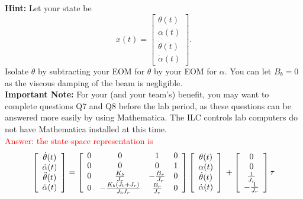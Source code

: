 \documentclass[12pt]{report}
\newcommand\drew[1]{\textcolor{red}{#1}}
\begin{document}
\begin{enumerate}
          \textbf{Hint:} Let your state be
          \[
              x(t) =
              \left[\begin{array}{c}
                      \theta(t)       \\
                      \alpha(t)       \\
                      \dot{\theta}(t) \\
                      \dot{\alpha}(t)
                  \end{array}\right].
          \]
          Isolate $\ddot{\theta}$ by subtracting your EOM for $\theta$ by your EOM for $\alpha$. You can let $B_b = 0$ as the viscous damping of the beam is negligible.\\

          \textbf{Important Note:} For your (and your team's) benefit, you may want to complete questions Q7 and Q8 before the lab period, as these questions can be answered more easily by using Mathematica. The ILC controls lab computers do not have Mathematica installed at this time. \\
          \drew{Answer: the state-space representation is
              \[
                  \left[\begin{array}{c}
                          \dot{\theta}(t)  \\
                          \dot{\alpha}(t)  \\
                          \ddot{\theta}(t) \\
                          \ddot{\alpha}(t)
                      \end{array}\right] =
                  \left[\begin{array}{c c c c}
                          0 & 0                                          & 1                & 0 \\
                          0 & 0                                          & 0                & 1 \\
                          0 & \frac{K_b}{J_r}                            & -\frac{B_r}{J_r} & 0 \\
                          0 & -\frac{K_b\left(J_b + J_r\right)}{J_b J_r} & \frac{B_r}{J_r}  & 0
                      \end{array}\right]
                  \left[\begin{array}{c}
                          \theta(t)       \\
                          \alpha(t)       \\
                          \dot{\theta}(t) \\
                          \dot{\alpha}(t)
                      \end{array}\right] \\ +
                  \left[\begin{array}{c}
                          0             \\
                          0             \\
                          \frac{1}{J_r} \\
                          -\frac{1}{J_r}
                      \end{array}\right] \tau
              \]}
\end{enumerate}
\end{document}
